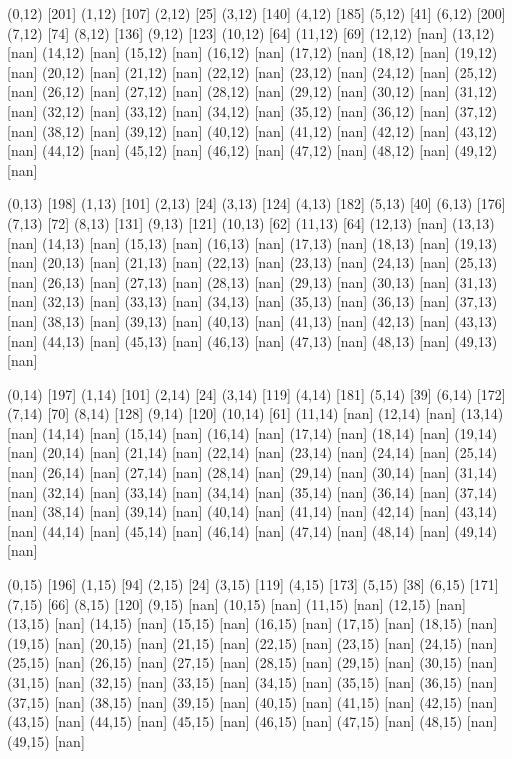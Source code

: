 {(0,12) [201] (1,12) [107] (2,12) [25] (3,12) [140] (4,12) [185] (5,12) [41] (6,12) [200] (7,12) [74] (8,12) [136] (9,12) [123] (10,12) [64] (11,12) [69] (12,12) [nan] (13,12) [nan] (14,12) [nan] (15,12) [nan] (16,12) [nan] (17,12) [nan] (18,12) [nan] (19,12) [nan] (20,12) [nan] (21,12) [nan] (22,12) [nan] (23,12) [nan] (24,12) [nan] (25,12) [nan] (26,12) [nan] (27,12) [nan] (28,12) [nan] (29,12) [nan] (30,12) [nan] (31,12) [nan] (32,12) [nan] (33,12) [nan] (34,12) [nan] (35,12) [nan] (36,12) [nan] (37,12) [nan] (38,12) [nan] (39,12) [nan] (40,12) [nan] (41,12) [nan] (42,12) [nan] (43,12) [nan] (44,12) [nan] (45,12) [nan] (46,12) [nan] (47,12) [nan] (48,12) [nan] (49,12) [nan] 

(0,13) [198] (1,13) [101] (2,13) [24] (3,13) [124] (4,13) [182] (5,13) [40] (6,13) [176] (7,13) [72] (8,13) [131] (9,13) [121] (10,13) [62] (11,13) [64] (12,13) [nan] (13,13) [nan] (14,13) [nan] (15,13) [nan] (16,13) [nan] (17,13) [nan] (18,13) [nan] (19,13) [nan] (20,13) [nan] (21,13) [nan] (22,13) [nan] (23,13) [nan] (24,13) [nan] (25,13) [nan] (26,13) [nan] (27,13) [nan] (28,13) [nan] (29,13) [nan] (30,13) [nan] (31,13) [nan] (32,13) [nan] (33,13) [nan] (34,13) [nan] (35,13) [nan] (36,13) [nan] (37,13) [nan] (38,13) [nan] (39,13) [nan] (40,13) [nan] (41,13) [nan] (42,13) [nan] (43,13) [nan] (44,13) [nan] (45,13) [nan] (46,13) [nan] (47,13) [nan] (48,13) [nan] (49,13) [nan] 

(0,14) [197] (1,14) [101] (2,14) [24] (3,14) [119] (4,14) [181] (5,14) [39] (6,14) [172] (7,14) [70] (8,14) [128] (9,14) [120] (10,14) [61] (11,14) [nan] (12,14) [nan] (13,14) [nan] (14,14) [nan] (15,14) [nan] (16,14) [nan] (17,14) [nan] (18,14) [nan] (19,14) [nan] (20,14) [nan] (21,14) [nan] (22,14) [nan] (23,14) [nan] (24,14) [nan] (25,14) [nan] (26,14) [nan] (27,14) [nan] (28,14) [nan] (29,14) [nan] (30,14) [nan] (31,14) [nan] (32,14) [nan] (33,14) [nan] (34,14) [nan] (35,14) [nan] (36,14) [nan] (37,14) [nan] (38,14) [nan] (39,14) [nan] (40,14) [nan] (41,14) [nan] (42,14) [nan] (43,14) [nan] (44,14) [nan] (45,14) [nan] (46,14) [nan] (47,14) [nan] (48,14) [nan] (49,14) [nan] 

(0,15) [196] (1,15) [94] (2,15) [24] (3,15) [119] (4,15) [173] (5,15) [38] (6,15) [171] (7,15) [66] (8,15) [120] (9,15) [nan] (10,15) [nan] (11,15) [nan] (12,15) [nan] (13,15) [nan] (14,15) [nan] (15,15) [nan] (16,15) [nan] (17,15) [nan] (18,15) [nan] (19,15) [nan] (20,15) [nan] (21,15) [nan] (22,15) [nan] (23,15) [nan] (24,15) [nan] (25,15) [nan] (26,15) [nan] (27,15) [nan] (28,15) [nan] (29,15) [nan] (30,15) [nan] (31,15) [nan] (32,15) [nan] (33,15) [nan] (34,15) [nan] (35,15) [nan] (36,15) [nan] (37,15) [nan] (38,15) [nan] (39,15) [nan] (40,15) [nan] (41,15) [nan] (42,15) [nan] (43,15) [nan] (44,15) [nan] (45,15) [nan] (46,15) [nan] (47,15) [nan] (48,15) [nan] (49,15) [nan] 

}
